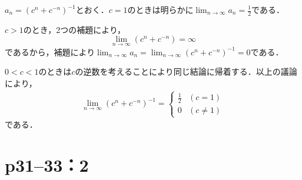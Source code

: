 \begin{tleftbar}
    $a_n = (c^n +c^{-n})^{-1}$とおく．$c=1$のときは明らかに$\lim_{n \to \infty} a_n =\frac{1}{2}$である．

    $c>1$のとき，2つの補題により，
    \[
        \lim_{n \to \infty} (c^n + c^{-n}) = \infty
    \]
    であるから，補題により$\lim_{n \to \infty} a_n = \lim_{n \to \infty} (c^n +c^{-n})^{-1} =0$である．

    $0<c<1$のときは$c$の逆数を考えることにより同じ結論に帰着する．以上の議論により，
    \begin{align*}
        \lim_{n \to \infty} (c^n +c^{-n})^{-1} =
        \begin{cases}
            \frac{1}{2} & (c=1)     \\
            0           & (c \ne 1)
        \end{cases}
    \end{align*}
    である．
\end{tleftbar}


\section*{p31--33：2}

